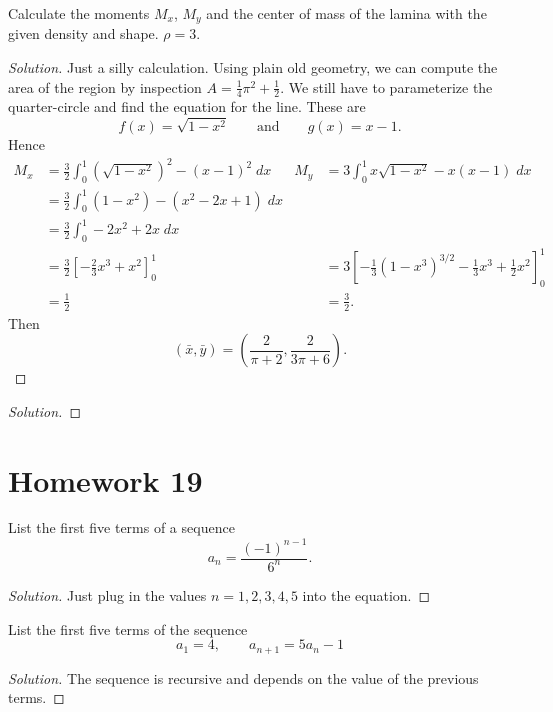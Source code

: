\begin{problem}
Calculate the moments $M_x$, $M_y$ and the center of mass of the lamina
with the given density and shape. $\rho=3$.
\end{problem}
\begin{proof}[Solution]
Just a silly calculation. Using plain old geometry, we can compute the area
of the region by inspection $A=\frac{1}{4}\pi^2+\frac{1}{2}$. We still have
to parameterize the quarter-circle and find the equation for the
line. These are
\[
f(x)=\sqrt{1-x^2}\qquad\text{and}\qquad g(x)=x-1.
\]
Hence
\begin{align*}
M_x&=\frac{3}{2}\int_0^1\left(\sqrt{1-x^2}\right)^2-(x-1)^2\;dx&
M_y&=3\int_0^1x\sqrt{1-x^2}-x(x-1)\;dx\\
   &=\frac{3}{2}\int_0^1(1-x^2)-(x^2-2x+1)\;dx\\
   &=\frac{3}{2}\int_0^1-2x^2+2x\;dx\\
   &=\frac{3}{2}\left[-\tfrac{2}{3}x^3+x^2\right]_0^1&
   &=3\left[-\tfrac{1}{3}\left(1-x^3\right)^{3/2}-\tfrac{1}{3}x^3+\tfrac{1}{2}x^2\right]_0^1\\
   &=\frac{1}{2}&
   &=\frac{3}{2}.
\end{align*}
Then
\[
\boxed{
(\bar x,\bar y)=
\left(\frac{2}{\pi+2},\frac{2}{3\pi+6}\right).
}
\]
\end{proof}

\begin{problem}
\end{problem}
\begin{proof}[Solution]
\end{proof}


\section{Homework 19}
\begin{problem}[HW 19, \# 1]
List the first five terms of a sequence
\[
a_n=\frac{(-1)^{n-1}}{6^n}.
\]
\end{problem}
\begin{proof}[Solution]
Just plug in the values $n=1,2,3,4,5$ into the equation.
\end{proof}

\begin{problem}[HW 19, \# 2]
List the first five terms of the sequence
\[
a_1=4,\qquad a_{n+1}=5a_n-1
\]
\end{problem}
\begin{proof}[Solution]
The sequence is recursive and depends on the value of the previous terms.
\end{proof}

